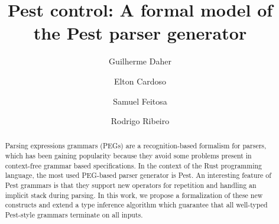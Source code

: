 \documentclass[preprint,12pt]{elsarticle}
\theoremstyle{definition}
\begin{document}
\begin{frontmatter}



\title{Pest control: A formal model of the Pest parser generator}

\author[ufop]{Guilherme Daher} %
\author[ufop]{Elton Cardoso}
\author[ufsc]{Samuel Feitosa}
\author[ufop]{Rodrigo Ribeiro} %


\begin{abstract}
Parsing expressions grammars (PEGs) are a recognition-based formalism for parsers,
which has been gaining popularity because they avoid some problems present in context-free grammar
based specifications. In the context of the Rust programming language, the most used
PEG-based parser generator is Pest. An interesting feature of Pest grammars is that they
support new operators for repetition and handling an implicit stack during parsing.
In this work, we propose a formalization of these new constructs and extend a
type inference algorithm which guarantee that all well-typed Pest-style grammars
terminate on all inputs.
\end{abstract}


\end{frontmatter}
\end{document}
